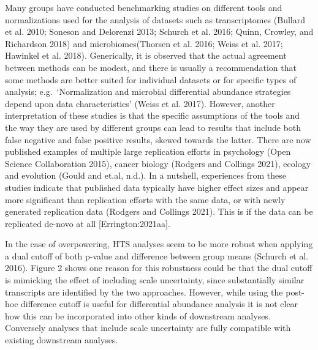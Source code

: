 \documentclass[
]{article}
\begin{document}
Many groups have conducted benchmarking studies on different tools and
normalizations used for the analysis of datasets such as transcriptomes
(Bullard et al. 2010; Soneson and Delorenzi 2013; Schurch et al. 2016;
Quinn, Crowley, and Richardson 2018) and microbiomes(Thorsen et al.
2016; Weiss et al. 2017; Hawinkel et al. 2018). Generically, it is
observed that the actual agreement between methods can be modest, and
there is usually a recommendation that some methods are better suited
for individual datasets or for specific types of analysis;
e.g.~`Normalization and microbial differential abundance strategies
depend upon data characteristics' (Weiss et al. 2017). However, another
interpretation of these studies is that the specific assumptions of the
tools and the way they are used by different groups can lead to results
that include both false negative and false positive results, skewed
towards the latter. There are now published examples of multiple large
replication efforts in psychology (Open Science Collaboration 2015),
cancer biology (Rodgers and Collings 2021), ecology and evolution (Gould
and et.al, n.d.). In a nutshell, experiences from these studies indicate
that published data typically have higher effect sizes and appear more
significant than replication efforts with the same data, or with newly
generated replication data (Rodgers and Collings 2021). This is if the
data can be replicated de-novo at all {[}Errington:2021aa{]}.

In the case of overpowering, HTS analyses seem to be more robust when
applying a dual cutoff of both p-value and difference between group
means (Schurch et al. 2016). Figure 2 shows one reason for this
robustness could be that the dual cutoff is mimicking the effect of
including scale uncertainty, since substantially similar transcripts are
identified by the two approaches. However, while using the post-hoc
difference cutoff is useful for differential abundance analysis it is
not clear how this can be incorporated into other kinds of downstream
analyses. Conversely analyses that include scale uncertainty are fully
compatible with existing downstream analyses.
\end{document}
